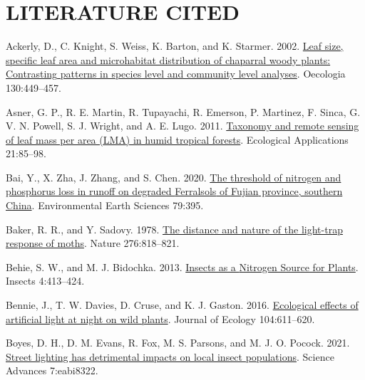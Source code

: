 \documentclass[
  12pt,
  letterpaper,
  DIV=11,
  numbers=noendperiod]{scrartcl}
\newlength{\cslhangindent}
\newlength{\cslentryspacingunit} %
\newenvironment{CSLReferences}[2] %
 {%
  \setlength{\parindent}{0pt}
  \ifodd #1
  \let\oldpar\par
  \def\par{\hangindent=\cslhangindent\oldpar}
  \fi
  \setlength{\parskip}{#2\cslentryspacingunit}
 }%
 {}
\begin{document}
\hypertarget{literature-cited}{%
\section{LITERATURE CITED}\label{literature-cited}}

\hypertarget{refs}{}
\begin{CSLReferences}{1}{0}
\leavevmode{}%
Ackerly, D., C. Knight, S. Weiss, K. Barton, and K. Starmer. 2002.
\href{https://doi.org/10.1007/s004420100805}{Leaf size, specific leaf
area and microhabitat distribution of chaparral woody plants:
{Contrasting} patterns in species level and community level analyses}.
Oecologia 130:449--457.

\leavevmode{}%
Asner, G. P., R. E. Martin, R. Tupayachi, R. Emerson, P. Martinez, F.
Sinca, G. V. N. Powell, S. J. Wright, and A. E. Lugo. 2011.
\href{https://doi.org/10.1890/09-1999.1}{Taxonomy and remote sensing of
leaf mass per area ({LMA}) in humid tropical forests}. Ecological
Applications 21:85--98.

\leavevmode{}%
Bai, Y., X. Zha, J. Zhang, and S. Chen. 2020.
\href{https://doi.org/10.1007/s12665-020-09130-z}{The threshold of
nitrogen and phosphorus loss in runoff on degraded {Ferralsols} of
{Fujian} province, southern {China}}. Environmental Earth Sciences
79:395.

\leavevmode{}%
Baker, R. R., and Y. Sadovy. 1978.
\href{https://doi.org/10.1038/276818a0}{The distance and nature of the
light-trap response of moths}. Nature 276:818--821.

\leavevmode{}%
Behie, S. W., and M. J. Bidochka. 2013.
\href{https://doi.org/10.3390/insects4030413}{Insects as a {Nitrogen
Source} for {Plants}}. Insects 4:413--424.

\leavevmode{}%
Bennie, J., T. W. Davies, D. Cruse, and K. J. Gaston. 2016.
\href{https://doi.org/10.1111/1365-2745.12551}{Ecological effects of
artificial light at night on wild plants}. Journal of Ecology
104:611--620.

\leavevmode{}%
Boyes, D. H., D. M. Evans, R. Fox, M. S. Parsons, and M. J. O. Pocock.
2021. \href{https://doi.org/10.1126/sciadv.abi8322}{Street lighting has
detrimental impacts on local insect populations}. Science Advances
7:eabi8322.


\end{CSLReferences}
\end{document}
